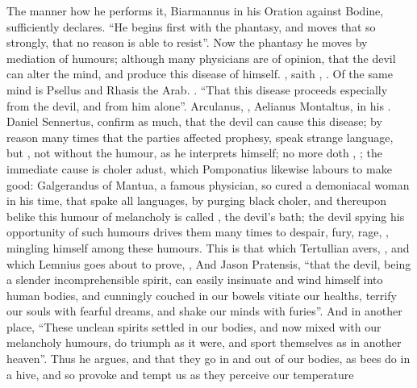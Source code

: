 The manner how he performs it, Biarmannus in his Oration against Bodine,
sufficiently declares. \enquote{He begins first with the phantasy,
and moves that so strongly, that no reason is able to resist}. Now the phantasy
he moves by mediation of humours; although many physicians are of opinion, that
the devil can alter the mind, and produce this disease of himself.
, saith \Avicenna{}, . Of the same mind is Psellus and Rhasis the
Arab. . \enquote{That
this disease proceeds especially from the devil, and from him alone}.
Arculanus, , Aelianus Montaltus, in
his . Daniel Sennertus,  confirm as much, that the devil can cause this disease;
by reason many times that the parties affected prophesy, speak strange
language, but , not without the humour, as he
interprets himself; no more doth \Avicenna{}, ; the immediate cause is choler adust, which
Pomponatius likewise labours to make good: Galgerandus of
Mantua, a famous physician, so cured a demoniacal woman in his time, that spake
all languages, by purging black choler, and thereupon belike this humour of
melancholy is called , the devil's bath; the devil spying
his opportunity of such humours drives them many times to despair, fury, rage,
\etc{}, mingling himself among these humours. This is that which Tertullian
avers, , \etc{} and which Lemnius goes about to prove,
, \etc{} And
Jason Pratensis, \enquote{that the devil, being a slender
incomprehensible spirit, can easily insinuate and wind himself into human
bodies, and cunningly couched in our bowels vitiate our healths, terrify our
souls with fearful dreams, and shake our minds with furies}. And in another
place, \enquote{These unclean spirits settled in our bodies, and now mixed with our
melancholy humours, do triumph as it were, and sport themselves as in another
heaven}. Thus he argues, and that they go in and out of our bodies, as bees do
in a hive, and so provoke and tempt us as they perceive our temperature
